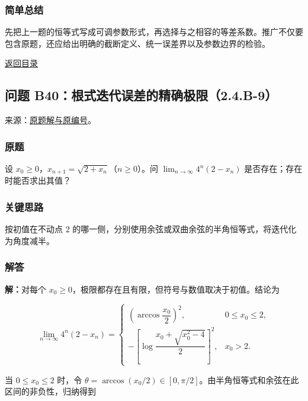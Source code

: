 \documentclass[11pt,a4paper]{article}
\begin{document}
\subsubsection{简单总结}\label{ux7b80ux5355ux603bux7ed3-4}

先把上一题的恒等式写成可调参数形式，再选择与之相容的等差系数。推广不仅要包含原题，还应给出明确的截断定义、统一误差界以及参数边界的检验。

\noindent\hyperref[contents]{返回目录}

\subsection{问题
B40：根式迭代误差的精确极限（2.4.B-9）}\label{ux95eeux9898-b40ux6839ux5f0fux8fedux4ee3ux8befux5deeux7684ux7cbeux786eux6781ux96502.4.b-9}

来源：\href{https://zj139.github.io/math-notes/problems/0ce2ad9c1d045270806e755b/\#问题-b40}{原题解与原编号}。

\subsubsection{原题}\label{ux539fux9898-5}

设 \(x_0\ge0\)，\(x_{n+1}=\sqrt{2+x_n}\)（\(n\ge0\)）。问
\(\lim_{n\to\infty}4^n(2-x_n)\) 是否存在；存在时能否求出其值？

\subsubsection{关键思路}\label{ux5173ux952eux601dux8def-5}

按初值在不动点 \(2\)
的哪一侧，分别使用余弦或双曲余弦的半角恒等式，将迭代化为角度减半。

\subsubsection{解答}\label{ux89e3ux7b54-5}

\textbf{解：}对每个
\(x_0\ge0\)，极限都存在且有限，但符号与数值取决于初值。结论为

\[
\boxed{\lim_{n\to\infty}4^n(2-x_n)=
\begin{cases}
\left(\arccos\dfrac{x_0}{2}\right)^2,&0\le x_0\le2,\\[6pt]
-\left[\log\dfrac{x_0+\sqrt{x_0^2-4}}2\right]^2,&x_0>2.
\end{cases}}
\]

当 \(0\le x_0\le2\) 时，令
\(\theta=\arccos(x_0/2)\in[0,\pi/2]\)。由半角恒等式和余弦在此区间的非负性，归纳得到
\end{document}
